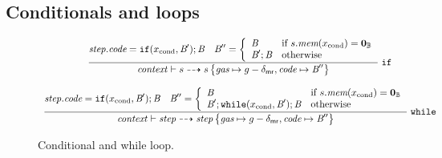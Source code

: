 \subsection{Conditionals and loops}

\begin{figure}[ht]
$$
\begin{array}{c}
\dfrac{
\mathit{step}.\textit{code} =  \mathtt{if}(x_\textrm{cond},\textit{B}');\textit{B}
\quad \textit{B}'' = \left\{\begin{array}{ll}
\textit{B}  &\hbox{if}\ s.\textit{mem}(x_\textrm{cond}) = \mathbf{0}_{\mathbb{B}} \\
\textit{B}';\textit{B}&\hbox{otherwise} \\
\end{array}\right.
} 
{
\mathit{context} \vdash s \dashrightarrow s\left\{
\textit{gas}\mapsto g-\delta_{\mathsf{mr}},
\textit{code}\mapsto \textit{B}''\right\}
}\;\mathtt{if}
\\\\
\dfrac{
\mathit{step}.\textit{code} =  \mathtt{if}(x_\textrm{cond},\textit{B}');\textit{B}
\quad \textit{B}'' = \left\{\begin{array}{ll}
\textit{B} &\hbox{if}\ s.\textit{mem}(x_\textrm{cond}) = \mathbf{0}_{\mathbb{B}}\\
\textit{B}';\mathtt{while}(x_\textrm{cond},\textit{B}');\textit{B} &\hbox{otherwise}
\end{array}\right.
} 
{
\mathit{context} \vdash \mathit{step} \dashrightarrow \mathit{step}\left\{\textit{gas}\mapsto g-\delta_{\mathsf{mr}},\textit{code}\mapsto \textit{B}''\right\}
}\;\mathtt{while} 
\end{array}
$$
\caption{Conditional and while loop.}
\end{figure}